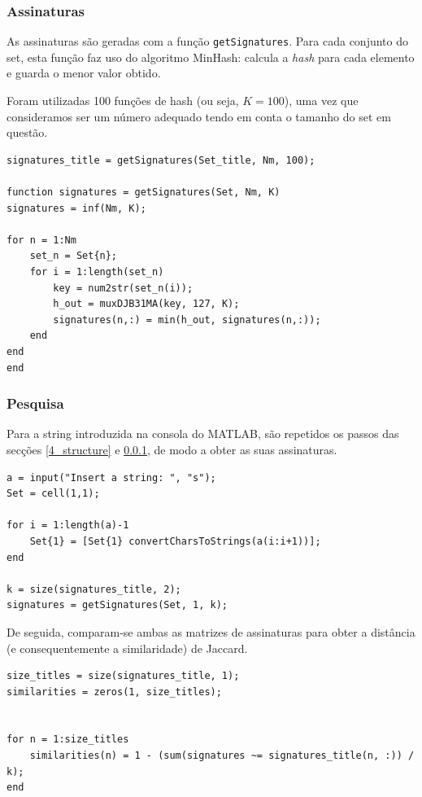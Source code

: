 \documentclass[portuguese, 11pt, a4paper,titlepage, oneside]{article}
\begin{document}
\subsubsection{Assinaturas} \label{4_signatures}
As assinaturas são geradas com a função \verb|getSignatures|. Para cada conjunto do set, esta função faz uso do algoritmo MinHash: calcula a \textit{hash} para cada elemento e guarda o menor valor obtido.

Foram utilizadas 100 funções de hash (ou seja, \(K = 100\)), uma vez que consideramos ser um número adequado tendo em conta o tamanho do set em questão.
\begin{lstlisting}[style=Matlab-editor]
signatures_title = getSignatures(Set_title, Nm, 100);

function signatures = getSignatures(Set, Nm, K)
signatures = inf(Nm, K);

for n = 1:Nm
    set_n = Set{n};
    for i = 1:length(set_n)
        key = num2str(set_n(i));
        h_out = muxDJB31MA(key, 127, K);
        signatures(n,:) = min(h_out, signatures(n,:));
    end
end
end
\end{lstlisting}

\subsubsection{Pesquisa}
Para a string introduzida na consola do MATLAB, são repetidos os passos das secções \ref{4_structure} e \ref{4_signatures}, de modo a obter as suas assinaturas.

\begin{lstlisting}[style=Matlab-editor]
a = input("Insert a string: ", "s");
Set = cell(1,1);

for i = 1:length(a)-1
    Set{1} = [Set{1} convertCharsToStrings(a(i:i+1))];
end

k = size(signatures_title, 2);
signatures = getSignatures(Set, 1, k);
\end{lstlisting}

De seguida, comparam-se ambas as matrizes de assinaturas para obter a distância (e consequentemente a similaridade) de Jaccard.

\begin{lstlisting}[style=Matlab-editor]
size_titles = size(signatures_title, 1);
similarities = zeros(1, size_titles);


for n = 1:size_titles
    similarities(n) = 1 - (sum(signatures ~= signatures_title(n, :)) / k);
end
\end{lstlisting}
\end{document}
